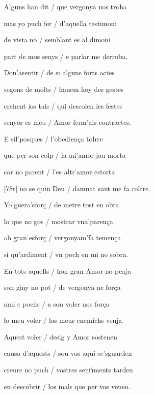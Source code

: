 \documentclass[12pt]{article}
\begin{document}
\begin{estrofa}

 Alguns han dit / que vergonya nos troba

 mas yo puch fer / d'aquella testimoni

 de vista no / semblant es al dimoni

 part de mos senys / e parlar me derroba.

 Don'asentir / de si alguns forts actes

 segons de molts / hauem hoy des gestes

 crehent los tals / qui descolen les festes

 senyor es meu / Amor ferm'als contractes.

\end{estrofa}



\begin{estrofa}

 E sil'posques / l'obedien\c{c}a tolrre

 que per son colp / la mi'amor jau morta

 car no parent / l'es altr'amor estorta

 [78r] no se quin Deu / damnat sant me fa colrre.

 Yo'guera'sfor\c{c} / de metre tost en obra

 lo que no gos / mostrar vna'paren\c{c}a

 ab gran esfor\c{c} / vergonyam'fa temen\c{c}a

 si qu'ardiment / vn poch en mi no sobra.

\end{estrofa}



\begin{estrofa}

 En tots aquells / hon gran Amor no penja

 son giny no pot / de vergonya ne for\c{c}a

 ami e pochs / a son voler nos for\c{c}a

 lo meu voler / los meus enemichs venja.

 Aquest voler / desig y Amor sostenen

 causa d'aquests / sou vos aqui se'sguarden

 creure no puch / vostres sent\'{\i}ments tarden

 en descobrir / los mals que per vos venen.

\end{estrofa}
\end{document}
